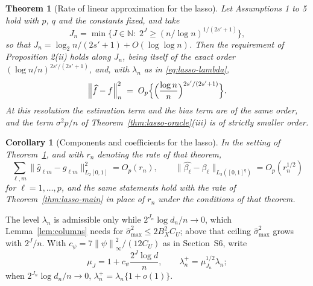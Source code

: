 \documentclass[10pt]{book}
\newtheorem{theorem}{Theorem}[section]
\newtheorem{corollary}{Corollary}[section]
\theoremstyle{definition}
\newcommand{\norm}[1]{\left\lVert #1 \right\rVert}
\newcommand{\normn}[1]{\left\lVert #1 \right\rVert_{n}}
\newcommand{\cv}{\ell}
\newcommand{\md}{m}
\newcommand{\fcoef}[1]{\beta_{#1}}
\newcommand{\gcomp}[2]{g_{#1#2}}
\newcommand{\penn}{\lambda_{n}}
\newcommand{\seff}{s'}
\newcommand{\smax}{\widehat{\sigma}_{\max}}
\begin{document}
{\begin{theorem}[Rate of linear approximation for the lasso]
\label{thm:lasso-linear}
Let Assumptions 1 to 5 hold with $p$, $q$ and the constants fixed, and take
\begin{equation}
  \label{eq:lasso-Jn}
  J_n = \min\bigl\{J \in \mathbb{N} :\;
  2^{J} \ge (n/\log n)^{1/(2\seff+1)}\bigr\},
\end{equation}
so that $J_n = \log_2 n/(2\seff+1) + O(\log\log n)$. Then the requirement of
Proposition 2(ii) holds along $J_n$, being itself of the exact order
$(\log n/n)^{2\seff/(2\seff+1)}$, and, with $\penn$ as in
\eqref{eq:lasso-lambda},
\[
  \normn{\widehat{f}-f}^{2}
  \;=\; O_p\Bigl\{\Bigl(\frac{\log n}{n}\Bigr)^{2\seff/(2\seff+1)}\Bigr\} .
\]
At this resolution the estimation term and the bias term are of the same
order, and the term $\sigma^{2}p/n$ of Theorem~\ref{thm:lasso-oracle}(iii) is
of strictly smaller order.
\end{theorem}

\begin{corollary}[Components and coefficients for the lasso]
\label{cor:lasso-components}
In the setting of Theorem~\ref{thm:lasso-linear}, and with $r_n$ denoting the
rate of that theorem,
\[
  \sum_{\cv,\md}\bigl\lVert\widehat{g}_{\cv\md}-\gcomp{\cv}{\md}
  \bigr\rVert_{L_2[0,1]}^{2} = O_p(r_n),
  \qquad
  \bigl\lVert\widehat{\fcoef{\cv}}-\fcoef{\cv}
  \bigr\rVert_{L_2([0,1]^{q})} = O_p(r_n^{1/2})
\]
for $\cv = 1,\dots,p$, and the same statements hold with the rate of
Theorem~\ref{thm:lasso-main} in place of $r_n$ under the conditions of that
theorem.
\end{corollary}

The level $\penn$ is admissible only while $2^{J_n}\log d_n/n \to 0$, which
Lemma~\ref{lem:columns} needs for $\smax^{2} \le 2B_X^{2}C_U$; above that
ceiling $\smax^{2}$ grows with $2^{J}/n$. With $c_{\psi} =
7\norm{\psi}_{\infty}^{2}/(12C_U)$ as in Section~S6, write
\begin{equation}
  \label{eq:lasso-lamplus}
  \mu_{J} = 1 + c_{\psi}\frac{2^{J}\log d}{n},
  \qquad
  \penn^{+} = \mu_{J_n}^{1/2}\penn ;
\end{equation}
when $2^{J_n}\log d_n/n \to 0$, $\penn^{+} = \penn\{1 + o(1)\}$.

}
\end{document}
